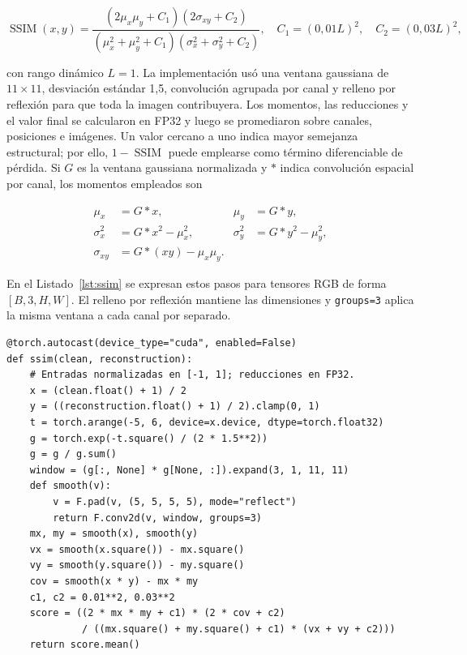 \begin{equation}
    \operatorname{SSIM}(x,y)=
    \frac{(2\mu_x\mu_y+C_1)(2\sigma_{xy}+C_2)}
         {(\mu_x^2+\mu_y^2+C_1)(\sigma_x^2+\sigma_y^2+C_2)},
    \quad C_1=(0,01L)^2,\quad C_2=(0,03L)^2,
    \label{eq:ssim}
\end{equation}

con rango dinámico \(L=1\). La implementación usó una ventana gaussiana de
\(11\times11\), desviación estándar 1,5, convolución agrupada por canal y
relleno por reflexión para que toda la imagen contribuyera. Los momentos, las
reducciones y el valor final se calcularon en FP32 y luego se promediaron sobre
canales, posiciones e imágenes. Un valor cercano a uno indica mayor semejanza
estructural; por ello, \(1-\operatorname{SSIM}\) puede emplearse como término
diferenciable de pérdida. Si \(G\) es la ventana gaussiana normalizada y
\(*\) indica convolución espacial por canal, los momentos empleados son

\begin{equation}
\begin{aligned}
\mu_x&=G*x, &\mu_y&=G*y,\\
\sigma_x^2&=G*x^2-\mu_x^2,
&\sigma_y^2&=G*y^2-\mu_y^2,\\
\sigma_{xy}&=G*(xy)-\mu_x\mu_y.
\end{aligned}
\label{eq:momentos-ssim}
\end{equation}

En el Listado~\ref{lst:ssim} se expresan estos pasos para tensores RGB de forma
\([B,3,H,W]\). El relleno por reflexión mantiene las dimensiones y
\texttt{groups=3} aplica la misma ventana a cada canal por separado.

\begingroup{}
\begin{lstlisting}[float=tp,basicstyle=\ttfamily\footnotesize,caption={Cálculo de SSIM mediante momentos gaussianos locales.},label={lst:ssim}]
@torch.autocast(device_type="cuda", enabled=False)
def ssim(clean, reconstruction):
    # Entradas normalizadas en [-1, 1]; reducciones en FP32.
    x = (clean.float() + 1) / 2
    y = ((reconstruction.float() + 1) / 2).clamp(0, 1)
    t = torch.arange(-5, 6, device=x.device, dtype=torch.float32)
    g = torch.exp(-t.square() / (2 * 1.5**2))
    g = g / g.sum()
    window = (g[:, None] * g[None, :]).expand(3, 1, 11, 11)
    def smooth(v):
        v = F.pad(v, (5, 5, 5, 5), mode="reflect")
        return F.conv2d(v, window, groups=3)
    mx, my = smooth(x), smooth(y)
    vx = smooth(x.square()) - mx.square()
    vy = smooth(y.square()) - my.square()
    cov = smooth(x * y) - mx * my
    c1, c2 = 0.01**2, 0.03**2
    score = ((2 * mx * my + c1) * (2 * cov + c2)
             / ((mx.square() + my.square() + c1) * (vx + vy + c2)))
    return score.mean()
\end{lstlisting}
\endgroup

